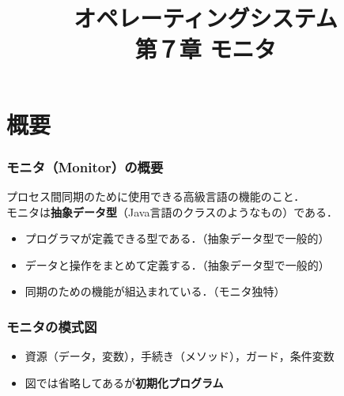 \documentclass{beamer}                   %
\begin{document}
\title[OS]{オペレーティングシステム\\第７章 モニタ}
\date{}

\begin{frame}
  \titlepage
\end{frame}


\section{概要}
\begin{frame}
  \frametitle{モニタ（Monitor）の概要}

プロセス間同期のために使用できる高級言語の機能のこと．\\
モニタは{\bf 抽象データ型}（Java言語のクラスのようなもの）である．

\begin{itemize}
\item プログラマが定義できる型である．（抽象データ型で一般的）
\item データと操作をまとめて定義する．（抽象データ型で一般的）
\item 同期のための機能が組込まれている．（モニタ独特）
\end{itemize}
\end{frame}

\begin{frame}
  \frametitle{モニタの模式図}
  \begin{itemize}
  \item 資源（データ，変数），手続き（メソッド），ガード，条件変数
  \item 図では省略してあるが{\bf 初期化プログラム}
  \end{itemize}
\end{frame}
\end{document}
